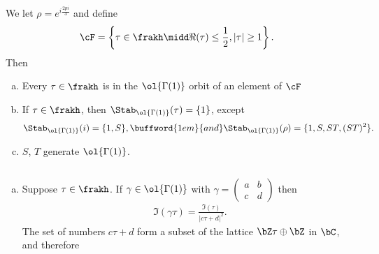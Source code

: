 \begin{thm}\label{thm:fund-domain-SL2}
	We let $\rho = e^{i\frac{2pi}{3}}$ and define
	\begin{align*}
		\cF &= \left\{\tau \in \frakh \midd \Re(\tau) \leq \frac{1}{2}, |\tau| \geq 1\right\}.
	\end{align*}
	Then
	\begin{enumerate}[(a)]
		\item Every $\tau \in \frakh$ is in the $\ol{\Gamma(1)}$ orbit of an element of $\cF$
		\item If $\tau \in \frakh$, then $\Stab_{\ol{\Gamma(1)}}(\tau) = \{1\}$, except
			\begin{align*}
				\Stab_{\ol{\Gamma(1)}}(i) = \{1, S\}, \buffword{1em}{and} \Stab_{\ol{\Gamma(1)}}(\rho) = \{1, S, ST, (ST)^2\}.
			\end{align*}
		\item $S$, $T$ generate $\ol{\Gamma(1)}$.
	\end{enumerate}
\end{thm}
\begin{prf}$ $
	\begin{enumerate}[(a)]
		\item Suppose $\tau \in \frakh$. If $\gamma \in \ol{\Gamma(1)}$ with $\gamma = \begin{pmatrix} a & b \\ c & d \end{pmatrix}$ then
			\begin{align*}
				\Im(\gamma \tau) = \frac{\Im(\tau)}{|c\tau + d|^2}.
			\end{align*}
			 The set of numbers $c\tau + d$ form a subset of the lattice $\bZ \tau \oplus \bZ$ in $\bC$, and therefore 
	\end{enumerate}
\end{prf}



